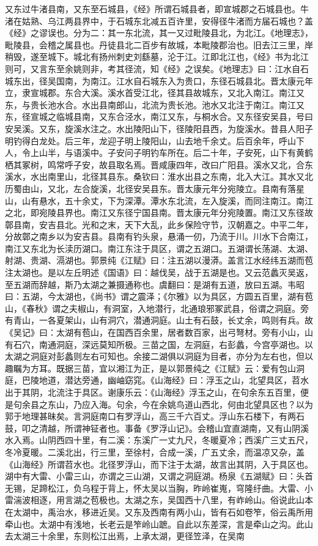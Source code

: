 \documentclass[12pt,UTF8]{ctexbook}
\begin{document}
又东过牛渚县南，又东至石城县，《经》所谓石城县者，即宣城郡之石城县也。牛渚在姑熟、乌江两县界中，于石城东北减五百许里，安得径牛渚而方届石城也？盖《经》之谬误也。分为二：其一东北流，其一又过毗陵县北，为北江。《地理志》，毗陵县，会稽之属县也。丹徒县北二百步有故城，本毗陵郡治也。旧去江三里，岸稍毁，遂至城下。城北有扬州刺史刘繇墓，沦于江。江即北江也，《经》书为北江则可，又言东至余姚则非，考其径流，知《经》之误矣。《地理志》曰：江水自石城东出，径吴国南，为南江。江水自石城东入为贵口，东径石城县北。晋太康元年立，隶宣城郡。东合大溪。溪水首受江北，径其县故城东，又北入南江。南江又东，与贵长池水合。水出县南郎山，北流为贵长池。池水又北注于南江。南江又东，径宣城之临城县南，又东合泾水，南江又东，与桐水合。又东径安吴县，号曰安吴溪。又东，旋溪水注之。水出陵阳山下，径陵阳县西，为旋溪水。昔县人阳子明钓得白龙处。后三年，龙迎子明上陵阳山，山去地千余丈。后百余年，呼山下人，令上山半，与语溪中。子安问子明钓车所在。后二十年，子安死，山下有黄鹤栖其冢树，鸣常呼子安，故县取名焉。晋咸康四年，改曰广阳县。溪水又北，合东溪水，水出南里山，北径其县东。桑钦曰：淮水出县之东南，北入大江。其水又北历蜀由山，又北，左合旋溪，北径安吴县东。晋太康元年分宛陵立。县南有落星山，山有悬水，五十余丈，下为深潭。潭水东北流，左入旋溪，而同注南江。南江之北，即宛陵县界也。南江又东径宁国县南。晋太康元年分宛陵置。南江又东径故鄣县南，安吉县北。光和之末，天下大乱，此乡保险守节，汉朝嘉之。中平二年，分故鄣之南乡以为安吉县。县南有钓头泉，悬涌一仞，乃流于川。川水下合南江，南江又东北为长渎历湖口。南江东注于具区，谓之五湖口。五湖谓长荡湖、太湖、射湖、贵湖、滆湖也。郭景纯《江赋》曰：注五湖以漫漭。盖言江水经纬五湖而苞注太湖也。是以左丘明述《国语》曰：越伐吴，战于五湖是也。又云范蠡灭吴返，至五湖而辞越，斯乃太湖之兼摄通称也。虞翻曰：是湖有五道，放曰五湖。韦昭曰：五湖，今太湖也，《尚书》谓之震泽；《尔雅》以为具区，方圆五百里，湖有苞山，《春秋》谓之夫椒山，有洞室，入地潜行，北通琅邪冢武县，俗谓之洞庭。旁有青山，一各夏架山，山有洞穴，潜通洞庭。山土有石鼓，长丈余，鸣则有兵。故《吴记》曰：太湖有苞山，在国西百余里，居者数百家，出弓弩材。旁有小山，山有石穴，南通洞庭，深远莫知所极。三苗之国，左洞庭，右彭蠡，今宫亭湖也。以太湖之洞庭对彭蠡则左右可知也。余接二湖俱以洞庭为目者，亦分为左右也，但以趣瞩为方耳。既据三苗，宜以湘江为正，是以郭景纯之《江赋》云：爱有包山洞庭，巴陵地道，潜达旁通，幽岫窈窕。《山海经》曰：浮玉之山，北望具区，苕水出于其阴，北流注于具区。谢康乐云：《山海经》浮玉之山，在句余东五百里，便是句余县之东山，乃应入海。句余，今在余姚鸟道山西北，何由北望具区也？以为郭于地理甚昧矣。言洞庭南口有罗浮山，高三千六百丈。浮山东石楼下，有两石鼓，叩之清越，所谓神钲者也。事备《罗浮山记》。会稽山宜直湖南，又有山阴溪水入焉。山阴西四十里，有二溪：东溪广一丈九尺，冬暖夏冷；西溪广三丈五尺，冬冷夏暖。二溪北出，行三里，至徐村，合成一溪，广五丈余，而温凉又杂，盖《山海经》所谓苕水也。北径罗浮山，而下注于太湖，故言出其阴，入于具区也。湖中有大雷、小雷三山，亦谓之三山湖，又谓之洞庭湖。杨泉《五湖赋》曰：头首无锡，足蹄松江，负乌程于背上，怀太吴以当胸，昨岭崔嵬，穹隆纡曲。大雷、小雷湍波相逐，用言湖之苞极也。太湖之东，吴国西十八里，有岞岭山。俗说此山本在太湖中，禹治水，移进近吴。又东及西南有两小山，皆有石如卷笮，俗云禹所用牵山也。太湖中有浅地，长老云是笮岭山蹠。自此以东差深，言是牵山之沟。此山去太湖三十余里，东则松江出焉，上承太湖，更径笠泽，在吴南
\end{document}
